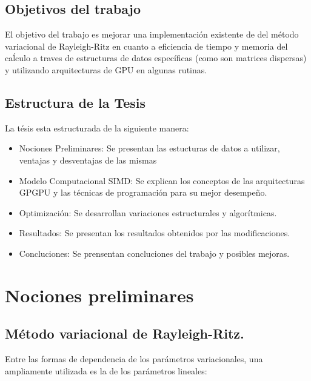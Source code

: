 \documentclass[a4paper,openright,12pt, oneside]{book}
\begin{document}
\section{Objetivos del trabajo}

El objetivo del trabajo es mejorar una implementaci\'on existente de del m\'etodo variacional de Rayleigh-Ritz en cuanto a eficiencia de tiempo y memoria del ca\'lculo a traves de estructuras de datos espec\'ificas (como son matrices dispersas) y utilizando arquitecturas de GPU en algunas rutinas.


\section{Estructura de la Tesis}

La t\'esis esta estructurada de la siguiente manera:

\begin{itemize}
    \item Nociones Preliminares: Se presentan las estucturas de datos a utilizar, ventajas y desventajas de las mismas
    \item Modelo Computacional SIMD: Se explican los conceptos de las arquitecturas GPGPU y las t\'ecnicas de programaci\'on para su mejor desempe\~no.
    \item Optimizaci\'on: Se desarrollan variaciones estructurales y algor\'itmicas. 
    \item Resultados: Se presentan los resultados obtenidos por las modificaciones.
    \item Concluciones: Se prensentan concluciones del trabajo y posibles mejoras.
\end{itemize}

\setcounter{chapter}{2}
\setcounter{section}{0}
\chapter*{Nociones preliminares}\label{Nociones preliminares}
\markboth{}{} %

\section{M\'etodo variacional de Rayleigh-Ritz.}

Entre las formas de dependencia de los par\'ametros variacionales, una ampliamente utilizada es la de los par\'ametros lineales:
\end{document}
